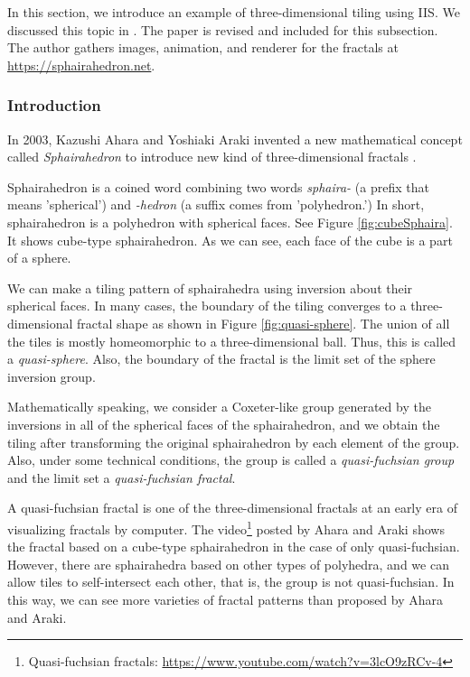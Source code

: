 \noindent In this section, we introduce an example of three-dimensional
tiling using IIS. 
We discussed this topic in \cite{bridges2018NakamuraAhara}. %
The paper is revised and included for this subsection.
The author gathers images, animation, and renderer for the fractals
at \url{https://sphairahedron.net}.

\subsubsection{Introduction}

In 2003, Kazushi Ahara and Yoshiaki Araki invented a new mathematical
concept called \textit{Sphairahedron} to introduce new kind of
three-dimensional fractals \cite{ahara2003sphairahedral}.

Sphairahedron is a coined word combining two words \textit{sphaira-}
(a prefix that means 'spherical') and \textit{-hedron} (a suffix comes
from 'polyhedron.')
In short, sphairahedron is a polyhedron with spherical faces.
See Figure \ref{fig:cubeSphaira}.
It shows cube-type sphairahedron. 
As we can see, each face of the cube is a part of a sphere.

We can make a tiling pattern of sphairahedra using inversion about their
spherical faces.
In many cases, the boundary of the tiling converges to a three-dimensional fractal
shape as shown in Figure \ref{fig:quasi-sphere}.
The union of all the tiles is mostly homeomorphic to a three-dimensional
ball. Thus, this is called a \textit{quasi-sphere}.
Also, the boundary of the fractal is the limit set of the sphere
inversion group.

Mathematically speaking, we consider a Coxeter-like group generated by the
inversions in all of the spherical faces of the sphairahedron, and
we obtain the tiling after transforming the original sphairahedron by
each element of the group.
Also, under some technical conditions, the group is called a
\textit{quasi-fuchsian group} and the limit set a \textit{quasi-fuchsian
fractal}.

A quasi-fuchsian fractal is one of the three-dimensional
fractals at an early era of visualizing fractals by computer.
The video\footnote{Quasi-fuchsian fractals:
\url{https://www.youtube.com/watch?v=3lcO9zRCv-4}}
posted by Ahara and Araki shows the fractal based on a cube-type
sphairahedron in the case of only quasi-fuchsian.
However, there are sphairahedra based on other types of polyhedra, and
we can allow tiles to self-intersect each other, that is, the group is
not quasi-fuchsian.
In this way, we can see more varieties of fractal patterns
than proposed by Ahara and Araki.
         
